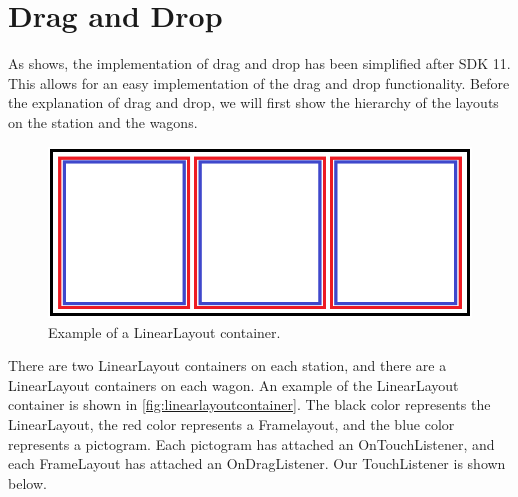 \section{Drag and Drop}
\label{sec:implementationdraganddrop}
As  shows, the implementation of drag and drop has been simplified after SDK 11. This allows for an easy implementation of the drag and drop functionality. Before the explanation of drag and drop, we will first show the hierarchy of the layouts on the station and the wagons.
\begin{figure}[H]
\centering
\includegraphics[width=0.9\linewidth]{img/layoutexample.png}%
\caption{Example of a LinearLayout container.}
\label{fig:linearlayoutcontainer}
\end{figure}
There are two LinearLayout containers on each station, and there are a LinearLayout containers on each wagon. An example of the LinearLayout container is shown in \autoref{fig:linearlayoutcontainer}. The black color represents the LinearLayout, the red color represents a Framelayout, and the blue color represents a pictogram. Each pictogram has attached an OnTouchListener, and each FrameLayout has attached an OnDragListener. Our TouchListener is shown below.

